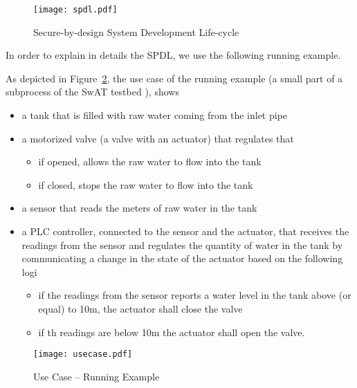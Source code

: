 \begin{figure}[t]
	\centering
	\texttt{[image: spdl.pdf]}
	\caption{Secure-by-design System Development Life-cycle}
	\label{fig:spdl}
\end{figure}

In order to explain in details the SPDL, we use the following running example.
\begin{example}
	As depicted in Figure~\ref{fig:usecase}, the use case of the running example
	(a small part of a subprocess of the SwAT testbed \autocite{}), shows
	\begin{itemize}[noitemsep]
		\item a tank that is filled with raw water coming from the inlet pipe 
		\item a motorized valve (a valve with an actuator) that regulates that
			\begin{itemize}
				\item if opened, allows the raw water to flow into the tank
				\item if closed, stops the raw water to flow into the tank
			\end{itemize}
		\item a sensor that reads the meters of raw water in the tank
		\item a PLC controller, connected to the sensor and the actuator, that receives the readings from the sensor and regulates the quantity of water in the tank by communicating a change in the state of the actuator based on the following logi
			\begin{itemize}
				\item if the readings from the sensor reports a water level in the tank above (or equal) to 10m, the actuator shall close the valve
				\item if th readings are below 10m the actuator shall open the valve.
			\end{itemize}
	\end{itemize}

\begin{figure}[t]
	\centering
	\texttt{[image: usecase.pdf]}
	\caption{Use Case -- Running Example}
	\label{fig:usecase}
\end{figure}
\end{example}

